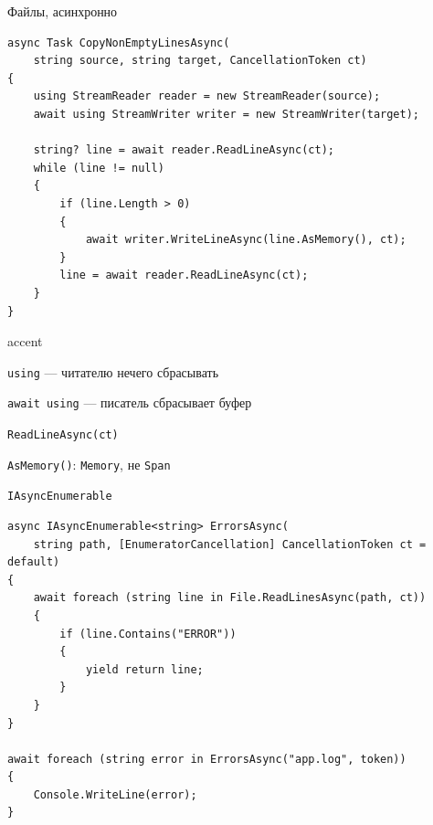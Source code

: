 \documentclass[aspectratio=169,10pt,t]{beamer}
\newcommand{\codexs}{\ttfamily\fontsize{7.0}{8.3}\selectfont}
\begin{document}
\begin{frame}[fragile]{Файлы, асинхронно}
  \slidetop
  \begin{minipage}[t]{0.67\textwidth}
\begin{lstlisting}[style=csharp,basicstyle=\codexs]
async Task CopyNonEmptyLinesAsync(
    string source, string target, CancellationToken ct)
{
    using StreamReader reader = new StreamReader(source);
    await using StreamWriter writer = new StreamWriter(target);

    string? line = await reader.ReadLineAsync(ct);
    while (line != null)
    {
        if (line.Length > 0)
        {
            await writer.WriteLineAsync(line.AsMemory(), ct);
        }
        line = await reader.ReadLineAsync(ct);
    }
}
\end{lstlisting}
  \end{minipage}\hfill
  \begin{minipage}[t]{0.29\textwidth}
    \par\vspace{0.6em}
    \small
    \begin{cbul}{accent}
      \item \texttt{using} --- читателю нечего сбрасывать
      \item \texttt{await using} --- писатель сбрасывает буфер
      \item \texttt{ReadLineAsync(ct)}
      \item \texttt{AsMemory()}: \texttt{Memory}, не \texttt{Span}
    \end{cbul}
  \end{minipage}
\end{frame}

\begin{frame}[fragile]{\texttt{IAsyncEnumerable}}
  \slidetop
\begin{lstlisting}[style=csharp,basicstyle=\codexs]
async IAsyncEnumerable<string> ErrorsAsync(
    string path, [EnumeratorCancellation] CancellationToken ct = default)
{
    await foreach (string line in File.ReadLinesAsync(path, ct))
    {
        if (line.Contains("ERROR"))
        {
            yield return line;
        }
    }
}

await foreach (string error in ErrorsAsync("app.log", token))
{
    Console.WriteLine(error);
}
\end{lstlisting}

  \vspace{0.3em}
\end{frame}
\end{document}
